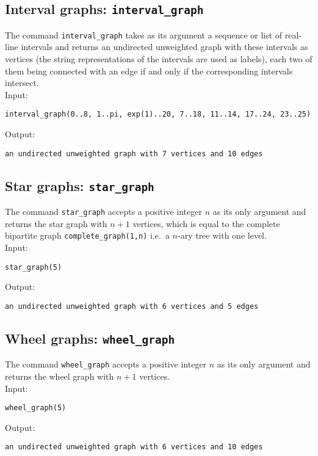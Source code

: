 \documentclass[a4paper,11pt]{article}
\begin{document}
\subsection{Interval graphs: {\tt interval\_graph}}

The command {\tt interval\_graph} takes as its argument a sequence or list of real-line intervals and returns an undirected unweighted graph with these intervals as vertices (the string representations of the intervals are used as labels), each two of them being connected with an edge if and only if the corresponding intervals intersect.\\
Input:
\begin{center}
  \tt interval\_graph(0..8, 1..pi, exp(1)..20, 7..18, 11..14, 17..24, 23..25)
\end{center}
Output:
\begin{center}
  \tt an undirected unweighted graph with 7 vertices and 10 edges
\end{center}

\subsection{Star graphs: {\tt star\_graph}}

The command {\tt star\_graph} accepts a positive integer $ n $ as its only argument and returns the star graph with $ n+1 $ vertices, which is equal to the complete bipartite graph {\tt complete\_graph(1,n)} i.e.~a $ n $-ary tree with one level.\\
Input:
\begin{center}
  \tt star\_graph(5)
\end{center}
Output:
\begin{center}
  \tt an undirected unweighted graph with 6 vertices and 5 edges
\end{center}

\subsection{Wheel graphs: {\tt wheel\_graph}}

The command {\tt wheel\_graph} accepts a positive integer $ n $ as its only argument and returns the wheel graph with $ n+1 $ vertices.\\
Input:
\begin{center}
  \tt wheel\_graph(5)
\end{center}
Output:
\begin{center}
  \tt an undirected unweighted graph with 6 vertices and 10 edges
\end{center}
\end{document}
